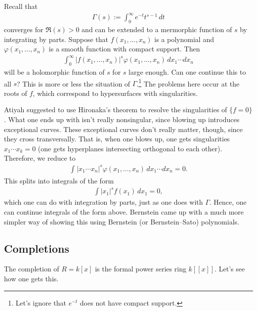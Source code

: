 \documentclass [11 pt, oneside, margin = 1 in] {article}
\begin{document}
\begin{example}\label{}\text{}
Recall that
\begin{align*}
	\Gamma(s) :=  \int_{0}^{\infty} e^{-t}t^{s-1}  \, dt
\end{align*}
	converges for $\Re (s)>0$ and can be extended to a mermorphic function of $s$ by integrating by parts. Suppose that $f(x_1,\hdots,x_n)$ is a polynomial and $\varphi(x_1,\hdots, x_n)$ is a smooth function with compact support. Then
	\begin{align*}
		\int_{0}^{\infty} \left\lvert f(x_1,\hdots, x_n) \right\rvert ^s\varphi(x_1,\hdots,x_n)  \, dx_1\cdots dx_n 
	\end{align*}
	will be a holomorphic function of $s$ for $s$ large enough. Can one continue this to all $s$? This is more or less the situation of $\Gamma$.\footnote{Let's ignore that $e^{-t}$ does not have compact support.} The problems here occur at the roots of $f$, which correspond to hypersurfaces with singularities.
	
	Atiyah suggested to use Hironaka's theorem to resolve the singularities of $\{f=0\}$. What one ends up with isn't really nonsingular, since blowing up introduces exceptional curves. These exceptional curves don't really matter, though, since they cross transversally. That is, when one blows up, one gets singularities $x_1\cdots x_k=0$ (one gets hyperplanes intersecting orthogonal to each other). Therefore, we reduce to 
	\begin{align*}
		\int_{}^{}  \left\lvert x_1\cdots x_n \right\rvert^s\varphi(x_1,\hdots,x_n)   \, dx_1\cdots dx_n =0.
	\end{align*}
	This splits into integrals of the form
	\begin{align*}
		\int\left\lvert x_1 \right\rvert ^sf(x_1)\, dx_1=0,
	\end{align*}
	which one can do with integration by parts, just as one does with $\Gamma$. Hence, one can continue integrals of the form above. Bernstein came up with a much more simpler way of showing this using Bernstein (or Bernstein--Sato) polynomials.
\end{example}

\subsection{Completions}
The completion of $R=k[x]$ is the formal power series ring $k[\![x]\!]$. Let's see how one gets this.
\end{document}
